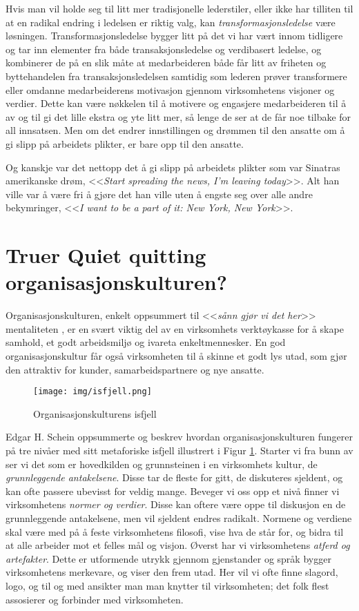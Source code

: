 \documentclass[a4paper, 12pt]{article}  %
\begin{document}
Hvis man vil holde seg til litt mer tradisjonelle lederstiler, eller ikke har tilliten til at en radikal endring i ledelsen er riktig valg, kan \emph{transformasjonsledelse} være løsningen. 
Transformasjonsledelse bygger litt på det vi har vært innom tidligere og tar inn elementer fra både transaksjonsledelse og verdibasert ledelse, og kombinerer de på en slik måte at medarbeideren både får litt av friheten og byttehandelen fra transaksjonsledelsen samtidig som lederen prøver transformere eller omdanne medarbeiderens motivasjon gjennom virksomhetens visjoner og verdier. 
Dette kan være nøkkelen til å motivere og engasjere medarbeideren til å av og til gi det lille ekstra og yte litt mer, så lenge de ser at de får noe tilbake for all innsatsen. 
Men om det endrer innstillingen og drømmen til den ansatte om å gi slipp på arbeidets plikter, er bare opp til den ansatte.

Og kanskje var det nettopp det å gi slipp på arbeidets plikter som var Sinatras amerikanske drøm, <<\emph{Start spreading the news, I'm leaving today}>>. Alt han ville var å være fri å gjøre det han ville uten å engste seg over alle andre bekymringer, <<\emph{I want to be a part of it: New York, New York}>>.

\newpage
\section{Truer Quiet quitting organisasjonskulturen?}

Organisasjonskulturen, enkelt oppsummert til <<\emph{sånn gjør vi det her}>> mentaliteten \parencite{ledelse}, er en svært viktig del av en virksomhets verktøykasse for å skape samhold, et godt arbeidsmiljø og ivareta enkeltmennesker.
En god organisasjonskultur får også virksomheten til å skinne et godt lys utad, som gjør den attraktiv for kunder, samarbeidspartnere og nye ansatte.

\begin{figure}[H]
  \centering
  \texttt{[image: img/isfjell.png]}
  \caption{Organisasjonskulturens isfjell \parencite{ledelse}}
  \label{fig:isfjell}
\end{figure}

Edgar H. Schein oppsummerte og beskrev hvordan organisasjonskulturen fungerer på tre nivåer med sitt metaforiske isfjell illustrert i Figur \ref{fig:isfjell}. 
Starter vi fra bunn av ser vi det som er hovedkilden og grunnsteinen i en virksomhets kultur, de \emph{grunnleggende antakelsene}. 
Disse tar de fleste for gitt, de diskuteres sjeldent, og kan ofte passere ubevisst for veldig mange.
Beveger vi oss opp et nivå finner vi virksomhetens \emph{normer og verdier}.
Disse kan oftere være oppe til diskusjon en de grunnleggende antakelsene, men vil sjeldent endres radikalt.
Normene og verdiene skal være med på å feste virksomhetens filosofi, vise hva de står for, og bidra til at alle arbeider mot et felles mål og visjon.
Øverst har vi virksomhetens \emph{atferd og artefakter}. Dette er utformende utrykk gjennom gjenstander og språk bygger virksomhetens merkevare, og viser den frem utad.
Her vil vi ofte finne slagord, logo, og til og med ansikter man man knytter til virksomheten; det folk flest assosierer og forbinder med virksomheten.
\end{document}
